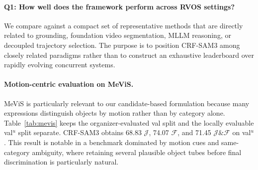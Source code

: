 \paragraph{Q1: How well does the framework perform across RVOS settings?}
We compare against a compact set of representative methods that are directly related to grounding, foundation video segmentation, MLLM reasoning, or decoupled trajectory selection. The purpose is to position CRF-SAM3 among closely related paradigms rather than to construct an exhaustive leaderboard over rapidly evolving concurrent systems.

\paragraph{Motion-centric evaluation on MeViS.}
MeViS is particularly relevant to our candidate-based formulation because many expressions distinguish objects by motion rather than by category alone. Table~\ref{tab:mevis} keeps the organizer-evaluated val split and the locally evaluable val$^u$ split separate. CRF-SAM3 obtains 68.83 $\mathcal{J}$, 74.07 $\mathcal{F}$, and 71.45 $\mathcal{J}\&\mathcal{F}$ on val$^u$. This result is notable in a benchmark dominated by motion cues and same-category ambiguity, where retaining several plausible object tubes before final discrimination is particularly natural.

\begin{table}[t]
\centering
\setlength{\tabcolsep}{5.4pt}
\renewcommand{\arraystretch}{1.08}
\caption{Representative comparison on MeViS. Val and val$^u$ use different evaluation protocols and are therefore shown separately.}
\label{tab:mevis}
\end{table}

